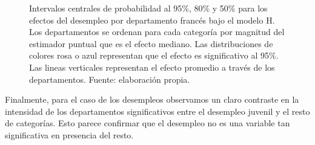 \begin{figure}
\begin{subfigure}{0.3\textwidth}
	\end{subfigure}
	\caption{Intervalos centrales de probabilidad al 95\%, 80\% y 50\% para los efectos del desempleo por departamento francés bajo el modelo H. Los departamentos se ordenan para cada categoría por magnitud del estimador puntual que es el efecto mediano. Las distribuciones de colores rosa o azul representan que el efecto es significativo al 95\%. Las lineas verticales representan el efecto promedio a través de los departamentos. Fuente: elaboración propia.}
	\label{fig:Efectos_Desempleo}
\end{figure}

 Finalmente, para el caso de los desempleos observamos un claro contraste en la intensidad de los departamentos significativos entre el desempleo juvenil y el resto de categorías. Esto parece confirmar que el desempleo no es una variable tan significativa en presencia del resto.\\ 

